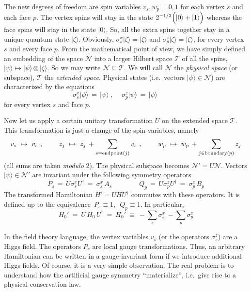 \documentclass[12pt]{article}
\newcommand{\calN}{\mathcal{N}}
\newcommand{\calT}{\mathcal{T}}
\begin{document}
The new degrees of freedom are spin variables $v_s,w_p=0,1$ for each vertex
$s$ and each face $p$. The vertex spins will stay in the state
$2^{-1/2}\Bigl(|0\rangle+|1\rangle\Bigr)$ whereas the face spins will stay in
the state $|0\rangle$. So, all the extra spins together stay in a unique
quantum state $|\zeta\rangle$. Obviously,
$\sigma^x_s|\zeta\rangle=|\zeta\rangle$ and
$\sigma^z_p|\zeta\rangle=|\zeta\rangle$, for every vertex $s$ and every face
$p$. From the mathematical point of view, we have simply defined an embedding
of the space $\calN$ into a larger Hilbert space $\calT$ of all the spins,\,
$|\psi\rangle\mapsto|\psi\rangle\otimes|\zeta\rangle$.  So we may write
$\calN\subseteq\calT$. We will call $\calN$ the \emph{physical space} (or
subspace), $\calT$ the \emph{extended space}. Physical states (i.e.\ vectors
$|\psi\rangle\in\calN$) are characterized by the equations
\[
  \sigma^x_s|\psi\rangle\,=\,|\psi\rangle\ , \quad\ 
  \sigma^z_p|\psi\rangle\,=\,|\psi\rangle\ \qquad\quad
\]
for every vertex $s$ and face $p$.

Now let us apply a certain unitary transformation $U$ on the extended space 
$\calT$. This transformation is just a change of the spin variables, namely
\begin{equation}
  v_s\ \mapsto\ v_s\ , 
  \qquad\ 
  z_j\ \mapsto\ z_j\, + \sum_{s=\mbox{\scriptsize endpoint}(j)} v_s\ ,
  \qquad\ 
  w_p\ \mapsto\ w_p\, + \sum_{j\in\mbox{\scriptsize boundary}(p)} z_j
\end{equation}
(all sums are taken \emph{modulo} 2). The physical subspace becomes 
$\calN'=U\calN$. Vectors $|\psi\rangle\in\calN'$ are invariant under the 
following symmetry operators
\begin{equation}\label{symop}
  P_s\,=\, U\sigma^x_s U^\dagger\, =\ \sigma^x_s\, A_s \qquad\qquad 
  Q_p\,=\, U\sigma^z_p U^\dagger\, =\ \sigma^z_p\, B_p
\end{equation}
The transformed Hamiltonian $H'=UHU^\dagger$ commutes with these operators.
It is defined up to the equivalence\, $P_s\equiv 1$,\,\, $Q_p\equiv 1$.
In particular, 
\begin{equation} \label{Ham_gauge}
  H_0'\ =\ U\,H_0\,U^\dagger\ =\ H_0'\ \equiv\ 
  - \sum_{s}\sigma^x_s\, -  \sum_{p}\sigma^z_p
\end{equation}

In the field theory language, the vertex variables $v_s$ (or the operators 
$\sigma^z_s$) are a Higgs field. The operators $P_s$ are local gauge 
transformations. Thus, an arbitrary Hamiltonian can be written in a 
gauge-invariant form if we introduce additional Higgs fields. Of course, 
it is a very simple observation. The real problem is to understand how the 
artificial gauge symmetry ``materialize'', i.e.\ give rise to a physical 
conservation law. 
\end{document}
